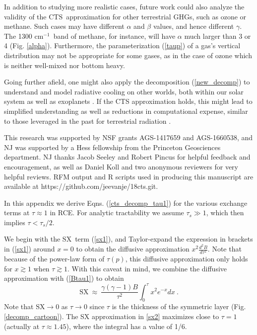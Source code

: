 \documentclass{ametsoc}
\newcommand{\beqn}{\begin{equation}}
\newcommand{\eeqn}{\end{equation}}
\newcommand{\eqnref}[1]{(\ref{#1})}
\newcommand{\cminverse}{\ensuremath{\mathrm{cm^{-1}}}}
\newcommand{\taus}{\ensuremath{\tau_s}}
\newcommand{\SX}{\ensuremath{\mathrm{SX}}}
\newcommand{\CTS}{\ensuremath{\mathrm{CTS}}}
\begin{document}
In addition to studying more realistic cases, future work could also analyze the validity of the \CTS\ approximation for other terrestrial GHGs, such as ozone or methane. Such cases may have different $\alpha$ and $\beta$ values, and hence different $\gamma$.  The 1300 \cminverse\ band of methane, for instance, will have  $\alpha$  much larger than 3 or 4 (Fig. \ref{alpha}). Furthermore, the parameterization \eqnref{taup} of a gas's vertical distribution may not be appropriate for some gases, as in the case of ozone which is neither well-mixed nor bottom heavy.  

Going further afield, one might also apply the decomposition \eqnref{new_decomp} to understand and model radiative cooling on other worlds, both within our solar system as well as exoplanets \citep[e.g.][]{amundsen2014}. If the CTS approximation holds, this might lead to simplified understanding as well as reductions in computational expense, similar to those leveraged in the past for terrestrial radiation  \citep[e.g.][]{schwarzkopf1991,fels1975}.

%
\acknowledgments
This research was supported by NSF grants AGS-1417659 and AGS-1660538, and NJ was supported by a  Hess fellowship from the Princeton Geosciences department.  NJ  thanks Jacob Seeley and Robert Pincus for helpful feedback and encouragement, as well as Daniel Koll and two anonymous reviewers for very helpful reviews. RFM output and R scripts used in producing this manuscript are available at  https://github.com/jeevanje/18cts.git.


%


\appendix[A]
\label{appendix_cts}
In this appendix we derive Eqns. \eqnref{cts_decomp_tau1} for the various exchange terms at $\tau\approx1$ in RCE. For analytic tractability we assume $\taus \gg 1$, which then implies $\tau < \taus/2$.

We begin with the \SX\ term \eqnref{sx1}, and Taylor-expand the expression in brackets in \eqnref{sx1} around $x=0$ to obtain the diffusive approximation $x^2\frac{d^2 B}{d \tau^2}$. Note that because of the power-law form of $\tau(p)$, this diffusive approximation only holds for $x\gtrsim 1$ when $\tau\gtrsim 1$. With this caveat in mind,  we combine the diffusive approximation with \eqnref{Btau1} to obtain
\beqn
 	\SX  \ \approx \    \frac{\gamma(\gamma-1) B}{ \tau^2} \int_0^\tau x^2 e^{-x} dx \ .
	\label{sx3}
\eeqn
Note that $\SX \rightarrow 0$ as $\tau\rightarrow 0$ since $\tau$ is the thickness of the symmetric layer (Fig. \ref{decomp_cartoon}). The SX  approximation in \eqref{sx2}  maximizes close to $\tau=1$ (actually at $\tau\approx 1.45$), where the integral has a value of 1/6. 
\end{document}
